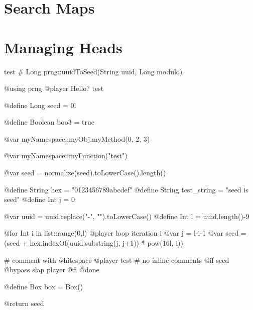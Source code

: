 \documentclass[oneside]{book}
\begin{document}
\section{Search Maps}
\blindtext

\section{Managing Heads}
\blindtext


\begin{msccode}{test}
# Long prng::uuidToSeed(String uuid, Long modulo)

@using prng
@player Hello? test

@define Long seed = 0l

@define Boolean boo3 = true

@var myNamespace::myObj.myMethod(0, 2, 3)

@var myNamespace::myFunction("test")

@var seed = normalize(seed).toLowerCase().length()

@define String hex = "0123456789abcdef"
@define String test_string = "seed is {{seed}}"
@define Int j = 0

@var uuid = uuid.replace("-", "").toLowerCase()
@define Int l = uuid.length()-9

@for Int i in list::range(0,l)
    @player loop iteration {{i}}
    @var j = l-i-1
    @var seed = (seed + hex.indexOf(uuid.substring(j, j+1)) * pow(16l, i)) %

    # comment with whitespace
    @player test # no inline comments
    @if seed %
        @bypass slap {{player}}
    @fi
@done

@define Box box = Box()

@return seed
\end{msccode}



\begin{versionhistory}
\end{versionhistory}
\end{document}
